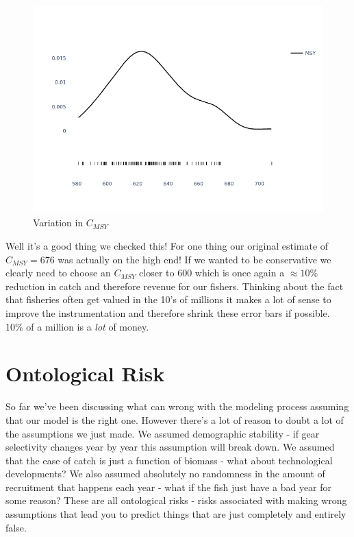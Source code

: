\documentclass[11pt,a5paper]{book}
\begin{document}
\begin{figure}[h!] 
  \includegraphics[width=\linewidth]{notebooks/SurplusModels/instrumentation.png}
  \caption{Variation in $C_{MSY}$}
  \label{fig:instrumentation_error}
\end{figure}

Well it's a good thing we checked this! For one thing our original estimate of $C_{MSY}=676$ was actually on the high end! If we wanted to be conservative we clearly need to choose an $C_{MSY}$ closer to 600 which is once again a $\approx 10\%$ reduction in catch and therefore revenue for our fishers. Thinking about the fact that fisheries often get valued in the 10's of millions it makes a lot of sense to improve the instrumentation and therefore shrink these error bars if possible. 10\% of a million is a \textit{lot} of money. 
\newline

\section{Ontological Risk}

So far we've been discussing what can wrong with the modeling process assuming that our model is the right one. However there's a lot of reason to doubt a lot of the assumptions we just made. We assumed demographic stability - if gear selectivity changes year by year this assumption will break down. We assumed that the ease of catch is just a function of biomass - what about technological developments? We also assumed absolutely no randomness in the amount of recruitment that happens each year - what if the fish just have a bad year for some reason? These are all ontological risks - risks associated with making wrong assumptions that lead you to predict things that are just completely and entirely false. 
\newline
\end{document}
